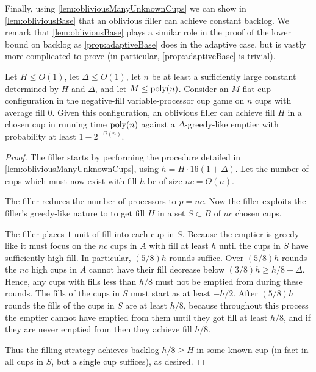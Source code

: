 Finally, using \cref{lem:obliviousManyUnknownCups} we can show in
\cref{lem:obliviousBase} that an oblivious filler can achieve
constant backlog. We remark that \cref{lem:obliviousBase} plays a
similar role in the proof of the lower bound on backlog as
\cref{prop:adaptiveBase} does in the adaptive case, but is vastly
more complicated to prove (in particular,
\cref{prop:adaptiveBase} is trivial).
\begin{lemma}
  \label{lem:obliviousBase}
  Let $H \le O(1)$, let $\Delta \le O(1)$, let $n$ be at
  least a sufficiently large constant determined by $H$ and
  $\Delta$, and let $M \le \operatorname{\text{poly}}(n)$. 
  Consider an $M$-flat cup configuration in the negative-fill variable-processor cup
  game on $n$ cups with average fill $0$.
  Given this configuration, an oblivious filler can achieve fill $H$
  in a chosen cup in running time $\operatorname{\text{poly}}(n)$ against a
  $\Delta$-greedy-like emptier with probability at least $1-2^{-\Omega(n)}.$
\end{lemma}
\begin{proof}
  The filler starts by performing the procedure detailed in
  \ref{lem:obliviousManyUnknownCups}, using $h = H\cdot
  16(1+\Delta)$. Let the number of cups which must now exist with
  fill $h$ be of size $nc = \Theta(n)$.

  The filler reduces the number of processors to $p=nc$. 
  Now the filler exploits the filler's greedy-like nature to
  to get fill $H$ in a set $S\subset B$ of $nc$ chosen cups.

  The filler places $1$ unit of fill into each cup in $S$.
  Because the emptier is greedy-like it must focus on the $nc$
  cups in $A$ with fill at least $h$ until the cups in $S$ have
  sufficiently high fill. In particular, $(5/8)h$ rounds suffice.
  Over $(5/8)h$ rounds the $nc$ high cups in $A$ cannot have
  their fill decrease below $(3/8)h \ge h/8 + \Delta$. Hence, any
  cups with fills less than $h/8$ must not be emptied from during
  these rounds. The fills of the cups in $S$ must start
  as at least $-h/2$. After $(5/8)h$ rounds the fills of the cups
  in $S$ are at least $h/8$, because throughout this process the
  emptier cannot have emptied from them until they got fill at
  least $h/8$, and if they are never emptied from then they
  achieve fill $h/8$.

  Thus the filling strategy achieves backlog $h/8 \ge H$ in some
  known cup (in fact in all cups in $S$, but a single cup
  suffices), as desired.

\end{proof}

